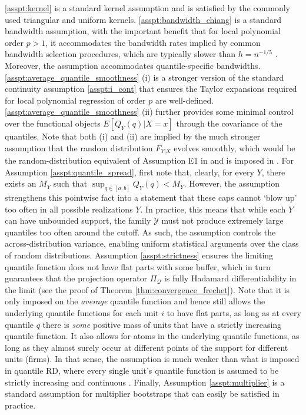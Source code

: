 \documentclass[12pt]{article}
\begin{document}
\ref{asspt:kernel} is a standard kernel assumption and is satisfied by the commonly used triangular and uniform kernels. 
\ref{asspt:bandwidth_chiang} is a standard bandwidth assumption, with the important benefit that for local polynomial order $p > 1$, it accommodates the bandwidth rates implied by common bandwidth selection procedures, which are typically slower than $h=n^{-1/5}$ \citep{calonico2014robust}. Moreover, the assumption accommodates quantile-specific bandwidths. \ref{asspt:average_quantile_smoothness} (i)  
is a stronger version of the standard continuity assumption \ref{asspt:i_cont} that ensures the Taylor expansions required for local polynomial regression of order $p$ are well-defined.  \ref{asspt:average_quantile_smoothness} (ii) further provides some minimal control over the functional objects $E[Q_Y(q) | X=x]$ through the covariance of the quantiles. Note that both (i) and (ii) are implied by the much stronger assumption that the random distribution $F_{Y|X}$ evolves smoothly, which would be the random-distribution equivalent of Assumption E1 in \citet{frandsen2012quantile} and is imposed in \citet{petersen2019frechet}. For Assumption \ref{asspt:quantile_spread}, first note that, clearly, for every $Y$, there exists an $M_Y$ such that $\sup_{q \in [a,b]} Q_Y(q) < M_Y$. However, the assumption strengthens this pointwise fact into a statement that these caps cannot `blow up' too often in all possible realizations $Y$. In practice, this means that while each $Y$ can have unbounded support, the family $\mathcal{Y}$ must not produce extremely large quantiles too often around the cutoff. As such, the assumption controls the across-distribution variance, enabling uniform statistical arguments over the class of random distributions. Assumption \ref{asspt:strictness} ensures the limiting quantile function does not have flat parts with some buffer, which in turn guarantees that the projection operator $\Pi_\mathcal{Q}$ is fully Hadamard differentiability in the limit (see the proof of Theorem \ref{thm:convergence_frechet}). Note that it is only imposed on the \textit{average} quantile function and hence still allows the underlying quantile functions for each unit $i$ to have flat parts, as long as at every quantile $q$ there is \textit{some} positive mass of units that have a strictly increasing quantile function. It also allows for atoms in the underlying quantile functions, as long as they almost surely occur at different points of the support for different units (firms). In that sense, the assumption is much weaker than what
is imposed in quantile RD, where every single unit’s quantile function is assumed to be strictly increasing and continuous \citep[Assumption Q]{frandsen2012quantile}. Finally, Assumption \ref{asspt:multiplier} is a standard assumption for multiplier bootstraps that can easily be satisfied in practice. 
\end{document}
